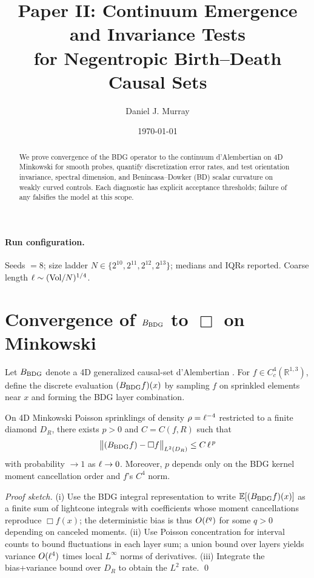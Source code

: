 \title{Paper II: Continuum Emergence and Invariance Tests\\
for Negentropic Birth--Death Causal Sets}
\author{Daniel J. Murray}
\date{\today}


\maketitle

\begin{abstract}
We prove convergence of the BDG operator to the continuum d’Alembertian on 4D Minkowski for smooth probes, quantify discretization error rates, and test orientation invariance, spectral dimension, and Benincasa–Dowker (BD) scalar curvature on weakly curved controls. Each diagnostic has explicit acceptance thresholds; failure of any falsifies the model at this scope.
\end{abstract}

\paragraph{Run configuration.}
Seeds $=8$; size ladder $N\in\{2^{10},2^{11},2^{12},2^{13}\}$; medians and IQRs reported. Coarse length $\ell\sim(\mathrm{Vol}/N)^{1/4}$.

\section{Convergence of $B_{\rm BDG}$ to $\Box$ on Minkowski}

Let $B_{\rm BDG}$ denote a 4D generalized causal-set d’Alembertian \citep{AslanbeigiEtAl2014}. For $f\in C_c^4(\mathbb{R}^{1,3})$, define the discrete evaluation $(B_{\rm BDG} f)(x)$ by sampling $f$ on sprinkled elements near $x$ and forming the BDG layer combination.

\begin{theorem}\label{thm:bdg}
On 4D Minkowski Poisson sprinklings of density $\rho=\ell^{-4}$ restricted to a finite diamond $D_R$, there exists $p>0$ and $C=C(f,R)$ such that
\[
\big\| (B_{\rm BDG} f) - \Box f \big\|_{L^2(D_R)} \le C\,\ell^{\,p}
\]
with probability $\to 1$ as $\ell\to 0$. Moreover, $p$ depends only on the BDG kernel moment cancellation order and $f$’s $C^4$ norm.
\end{theorem}

\noindent\emph{Proof sketch.}
(i) Use the BDG integral representation \citep{AslanbeigiEtAl2014} to write $\mathbb{E}[(B_{\rm BDG} f)(x)]$ as a finite sum of lightcone integrals with coefficients whose moment cancellations reproduce $\Box f(x)$; the deterministic bias is thus $O(\ell^{q})$ for some $q>0$ depending on canceled moments. (ii) Use Poisson concentration for interval counts to bound fluctuations in each layer sum; a union bound over layers yields variance $O(\ell^{4})$ times local $L^\infty$ norms of derivatives. (iii) Integrate the bias+variance bound over $D_R$ to obtain the $L^2$ rate. \qed

